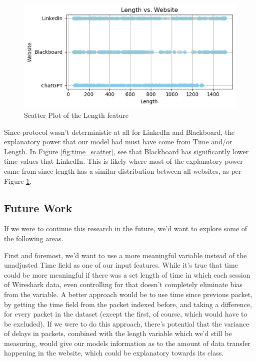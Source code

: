 \documentclass[10pt,sigconf,letterpaper,nonacm]{acmart}
\begin{document}
\begin{figure}
    \centering
    \includegraphics[width=1\linewidth]{Figures_and_Graphs/length_scatter.png}
    \caption{Scatter Plot of the Length feature}
    \label{fig:length_scatter}
\end{figure}

Since protocol wasn't deterministic at all for LinkedIn and Blackboard, the explanatory power that our model had must have come from Time and/or Length. In Figure \ref{fig:time_scatter}, see that Blackboard has significantly lower time values that LinkedIn. 
This is likely where most of the explanatory power came from since length has a similar distribution between all websites, as per Figure \ref{fig:length_scatter}.

\subsection{Future Work}

If we were to continue this research in the future, we'd want to explore some of the following areas.

First and foremost, we'd want to use a more meaningful variable instead of the unadjusted Time field as one of our input features. While it's true that time could be more meaningful if there was a set length of time in which each session of Wireshark data, even controlling for that doesn't completely eliminate bias from the variable. A better approach would be to use time since previous packet, by getting the time field from the packet indexed before, and taking a difference, for every packet in the dataset (except the first, of course, which would have to be excluded). If we were to do this approach, there's potential that the variance of delays in packets, combined with the length variable which we'd still be measuring, would give our models information as to the amount of data transfer happening in the website, which could be explanatory towards its class.
\end{document}
